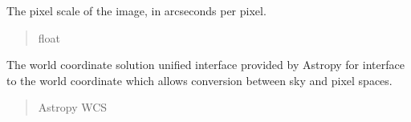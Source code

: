 \documentclass[letterpaper,11pt,english]{sphinxmanual}
\begin{document}
\begin{savenotes}
\begin{fulllineitems}

\begin{savenotes}\begin{fulllineitems}
\label{\detokenize{code/opihiexarata.astrometry.solution:opihiexarata.astrometry.solution.AstrometricSolution.pixel_scale}}
\pysigstartsignatures
{}
\pysigstopsignatures
\sphinxAtStartPar
The pixel scale of the image, in arcseconds per pixel.
\begin{quote}\begin{description}
\sphinxAtStartPar
float

\end{description}\end{quote}

\end{fulllineitems}\end{savenotes}


\begin{savenotes}\begin{fulllineitems}
\label{\detokenize{code/opihiexarata.astrometry.solution:opihiexarata.astrometry.solution.AstrometricSolution.wcs}}
\pysigstartsignatures
{}
\pysigstopsignatures
\sphinxAtStartPar
The world coordinate solution unified interface provided by Astropy
for interface to the world coordinate which allows conversion between
sky and pixel spaces.
\begin{quote}\begin{description}
\sphinxAtStartPar
Astropy WCS

\end{description}\end{quote}

\end{fulllineitems}\end{savenotes}



\end{fulllineitems}
\end{savenotes}
\end{document}
